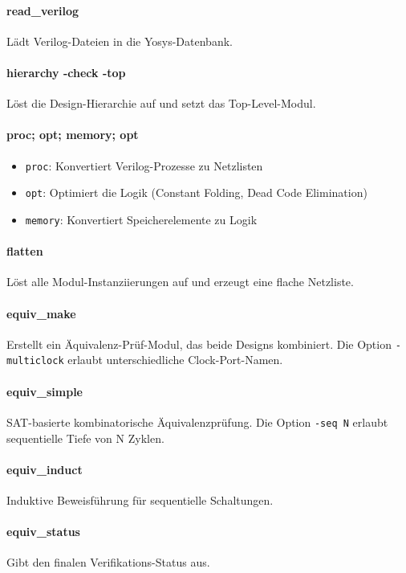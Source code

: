 ﻿\documentclass[12pt,a4paper]{report}
\begin{document}
\paragraph{read\_verilog}
Lädt Verilog-Dateien in die Yosys-Datenbank.

\paragraph{hierarchy -check -top}
Löst die Design-Hierarchie auf und setzt das Top-Level-Modul.

\paragraph{proc; opt; memory; opt}
\begin{itemize}
    \item \texttt{proc}: Konvertiert Verilog-Prozesse zu Netzlisten
    \item \texttt{opt}: Optimiert die Logik (Constant Folding, Dead Code Elimination)
    \item \texttt{memory}: Konvertiert Speicherelemente zu Logik
\end{itemize}

\paragraph{flatten}
Löst alle Modul-Instanziierungen auf und erzeugt eine flache Netzliste.

\paragraph{equiv\_make}
Erstellt ein Äquivalenz-Prüf-Modul, das beide Designs kombiniert. Die Option \texttt{-multiclock} erlaubt unterschiedliche Clock-Port-Namen.

\paragraph{equiv\_simple}
SAT-basierte kombinatorische Äquivalenzprüfung. Die Option \texttt{-seq N} erlaubt sequentielle Tiefe von N Zyklen.

\paragraph{equiv\_induct}
Induktive Beweisführung für sequentielle Schaltungen.

\paragraph{equiv\_status}
Gibt den finalen Verifikations-Status aus.
\end{document}
